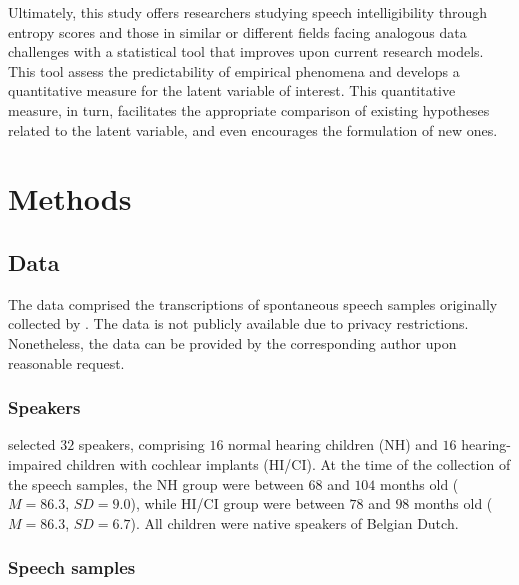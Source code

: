 \documentclass[
  authoryear,
  preprint,
  1p]{elsarticle}
\begin{document}
Ultimately, this study offers researchers studying speech
intelligibility through entropy scores and those in similar or different
fields facing analogous data challenges with a statistical tool that
improves upon current research models. This tool assess the
predictability of empirical phenomena and develops a quantitative
measure for the latent variable of interest. This quantitative measure,
in turn, facilitates the appropriate comparison of existing hypotheses
related to the latent variable, and even encourages the formulation of
new ones.

\section{Methods}\label{sec-methods}

\subsection{Data}\label{sec-M-D}

The data comprised the transcriptions of spontaneous speech samples
originally collected by \citet{Boonen_et_al_2023}. The data is not
publicly available due to privacy restrictions. Nonetheless, the data
can be provided by the corresponding author upon reasonable request.

\subsubsection{Speakers}\label{sec-M-S}

\citet{Boonen_et_al_2023} selected \(32\) speakers, comprising \(16\)
normal hearing children (NH) and \(16\) hearing-impaired children with
cochlear implants (HI/CI). At the time of the collection of the speech
samples, the NH group were between \(68\) and \(104\) months old
(\(M=86.3\), \(SD=9.0\)), while HI/CI group were between \(78\) and
\(98\) months old (\(M=86.3\), \(SD=6.7\)). All children were native
speakers of Belgian Dutch.

\subsubsection{Speech samples}\label{sec-M-SS}
\end{document}
